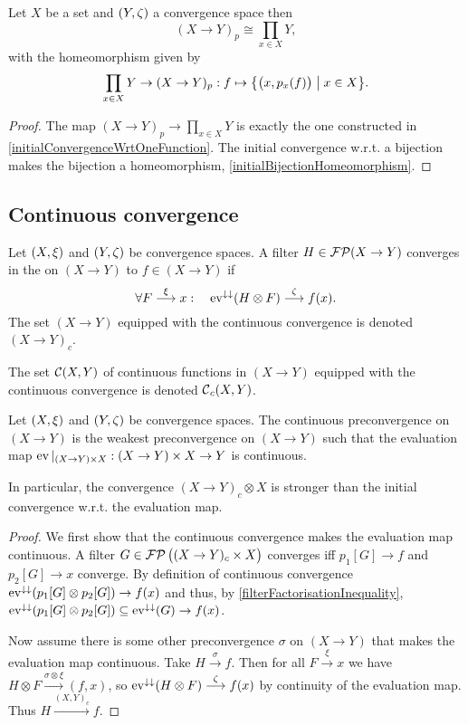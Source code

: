 \begin{proposition} \label{pointwiseConvergenceProductSpace}
Let $X$ be a set and $\sSet{Y,\zeta}$ a convergence space then
\[ (X\to Y)_p \cong \prod_{x\in X}Y, \]
with the homeomorphism given by
\[ \prod_{x\in X}Y \to (X\to Y)_p: f\mapsto \setbuilder{\big(x,p_x(f)\big)}{x\in X}. \]
\end{proposition}
\begin{proof}
The map $(X\to Y)_p \to \prod_{x\in X}Y$ is exactly the one constructed in \ref{initialConvergenceWrtOneFunction}. The initial convergence w.r.t. a bijection makes the bijection a homeomorphism, \ref{initialBijectionHomeomorphism}.
\end{proof}



\subsection{Continuous convergence}
\begin{definition}
Let $\sSet{X, \xi}$ and $\sSet{Y,\zeta}$ be convergence spaces. 
A filter $H\in \operatorname{\mathcal{FP}}(X\to Y)$ converges in the  on $(X\to Y)$ to $f\in (X\to Y)$ if
\[ \forall F\overset{\xi}{\longrightarrow} x: \quad \operatorname{ev}^{\downarrow\downarrow}(H \otimes F) \overset{\zeta}{\longrightarrow} f(x). \]
The set $(X\to Y)$ equipped with the continuous convergence is denoted $(X\to Y)_c$.

The set $\operatorname{\mathcal{C}}(X, Y)$ of continuous functions in $(X\to Y)$ equipped with the continuous convergence is denoted $\operatorname{\mathcal{C}}_c(X, Y)$.
\end{definition}

\begin{lemma} \label{evalMapContinuous}
Let $\sSet{X,\xi}$ and $\sSet{Y,\zeta}$ be convergence spaces. The continuous preconvergence on $(X\to Y)$ is the weakest preconvergence on $(X\to Y)$ such that the evaluation map $\operatorname{ev}|_{(X\to Y)\times X}: (X\to Y)\times X \to Y$ is continuous.

In particular, the convergence $(X\to Y)_c\otimes X$ is stronger than the initial convergence w.r.t. the evaluation map.
\end{lemma}
\begin{proof}
We first show that the continuous convergence makes the evaluation map continuous. A filter $G\in\operatorname{\mathcal{FP}}\big((X\to Y)_c\times X\big)$ converges iff $p_1[G]\to f$ and $p_2[G]\to x$ converge. By definition of continuous convergence $\operatorname{ev}^{\downarrow\downarrow}(p_1[G] \otimes p_2[G]) \to f(x)$ and thus, by \ref{filterFactorisationInequality}, $\operatorname{ev}^{\downarrow\downarrow}(p_1[G] \otimes p_2[G]) \subseteq \operatorname{ev}^{\downarrow\downarrow}(G) \to f(x)$.

Now assume there is some other preconvergence $\sigma$ on $(X\to Y)$ that makes the evaluation map continuous. Take $H \overset{\sigma}{\longrightarrow} f$. Then for all $F\overset{\xi}{\longrightarrow}x$ we have $H\otimes F\overset{\sigma\otimes \xi}{\longrightarrow} (f,x)$, so $\operatorname{ev}^{\downarrow\downarrow}(H\otimes F) \overset{\zeta}{\longrightarrow} f(x)$ by continuity of the evaluation map. Thus $H\overset{(X,Y)_c}{\longrightarrow} f$.
\end{proof}

